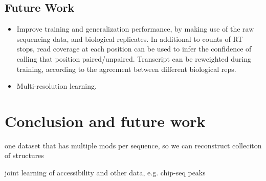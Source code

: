 \documentclass{proposal}
\begin{document}
\section{Future Work}

\begin{itemize}
  \item Improve training and generalization performance, by making use of the raw sequencing data, and biological replicates.
  In additional to counts of RT stops, read coverage at each position can be used to infer the confidence of calling that position paired/unpaired.
  Transcript can be reweighted during training, according to the agreement between different biological reps.

  \item Multi-resolution learning.
\end{itemize}


%
%

\chapter{Conclusion and future work}

one dataset that has multiple mods per sequence, so we can reconstruct colleciton of structures

joint learning of accessibility and other data, e.g. chip-seq peaks




\end{document}

